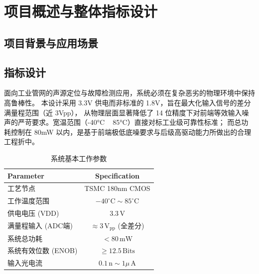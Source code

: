 \chapter{项目概述与整体指标设计}

\section{项目背景与应用场景}

\section{指标设计}
面向工业管网的声源定位与故障检测应用，系统必须在复杂恶劣的物理环境中保持高鲁棒性。
本设计采用 3.3V 供电而非标准的 1.8V，旨在最大化输入信号的差分满量程范围（近 3Vpp），
从物理层面显著降低了 14 位精度下对前端等效输入噪声的严苛要求。宽温范围（-40°C ~ 85°C）直接对标工业级可靠性标准；
而总功耗控制在 80mW 以内，是基于前端极低底噪要求与后级高驱动能力所做出的合理工程折中。
\begin{table}[htbp]
  \centering
  \caption{系统基本工作参数}
  \begin{tabular}{lc}
    \toprule
    Parameter & Specification \\
    \midrule
    工艺节点 & TSMC 180nm CMOS \\
    工作温度范围 & $-40^\circ\text{C} \sim 85^\circ\text{C}$ \\
    供电电压 (VDD) & 3.3\,V \\
    满量程输入 (ADC端) & $\approx 3\,\text{V}_\text{pp}$ (全差分) \\
    系统总功耗 & $<80\,\text{mW}$ \\
    系统有效位数 (ENOB) & $\ge 12.5\,\text{Bits}$ \\
    输入光电流 & $0.1\,\text{n} \sim 1\mu\,\text{A}$ \\
    \bottomrule
  \end{tabular}
  \label{tab:system_spec}
\end{table}

